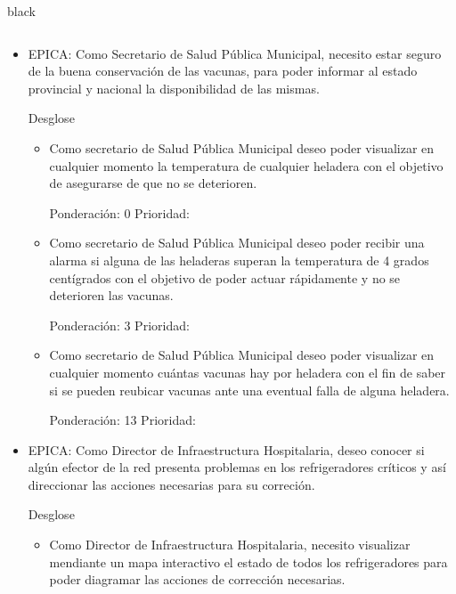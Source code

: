 \documentclass[11pt]{charter}
\begin{document}
\begin{consigna}{black}
\begin{table}[ht]
\begin{tabularx}{\linewidth}{@{}|l|X|X|l|@{}}
\end{tabularx}
\end{table}




\begin{itemize}
\item EPICA: Como Secretario de Salud Pública Municipal, necesito estar seguro de la buena conservación de las vacunas, para poder informar al estado provincial y nacional la disponibilidad de las mismas.

Desglose
	\begin{itemize}
	\item 
    Como secretario de Salud Pública Municipal deseo poder visualizar en cualquier momento la temperatura de cualquier heladera con el objetivo de asegurarse de que no se deterioren. 
    
Ponderación: 0 Prioridad:
	\end{itemize}
	
	\begin{itemize}
	\item 
	Como secretario de Salud Pública Municipal deseo poder recibir una alarma si alguna de las heladeras superan la temperatura de 4 grados centígrados con el objetivo de poder actuar rápidamente y no se deterioren las vacunas. 
	
Ponderación: 3 Prioridad:
	\end{itemize}

	\begin{itemize}
	\item 
	Como secretario de Salud Pública Municipal deseo poder visualizar en cualquier momento cuántas vacunas hay por heladera con el fin de saber si se pueden reubicar vacunas ante una eventual falla de alguna heladera. 

Ponderación: 13 Prioridad:
	\end{itemize}
\end{itemize}

\begin{itemize}
\item EPICA: Como Director de Infraestructura Hospitalaria, deseo conocer si algún efector de la red presenta problemas en los refrigeradores críticos y así direccionar las acciones necesarias para su correción. 

Desglose

	\begin{itemize}
	\item Como Director de Infraestructura Hospitalaria, necesito visualizar mendiante un mapa interactivo el estado de todos los refrigeradores para poder diagramar las acciones de corrección necesarias.  


\end{itemize}
\end{itemize}
\end{consigna}
\end{document}
